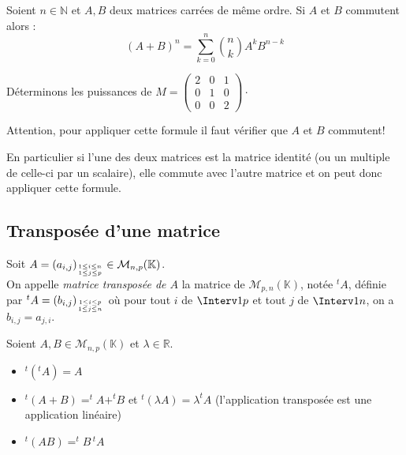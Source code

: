 \documentclass[a4paper,10pt]{report}
\begin{document}
\begin{thm}
Soient $n\in \mathbb{N}$ et $A,B$ deux matrices carrées de même ordre. Si $A$ et $B$ commutent alors :
\[ (A+B)^n = \sum_{k=0}^n \binom{n}{k} A^k B^{n-k} \]
\end{thm}

\begin{ex} Déterminons les puissances de $M = \begin{pmatrix}
2 & 0 & 1 \\
0 & 1 & 0 \\
0 & 0 & 2
\end{pmatrix}\cdot$

\vspace{10cm}
\end{ex}

\begin{rems}
\item Attention, pour appliquer cette formule il faut vérifier que $A$ et $B$ commutent!
\item En particulier si l'une des deux matrices est la matrice identité (ou un multiple de celle-ci par un scalaire), elle commute avec l'autre matrice et on peut donc appliquer cette formule.
\end{rems}

\subsection{Transposée d'une matrice}
\begin{defin}
 
Soit $A=(a_{i,j})_{{1 \leq i \leq n}\atop{1 \leq j \leq p}} \in \mathcal{M}_{n,p}(\mathbb{K})$.\\


\noindent On appelle \textit{matrice transposée de $A$} la matrice de $\mathcal{M}_{p,n}(\mathbb{K})$, notée $^tA$, définie par \linebreak $^tA=(b_{i,j})_{{1 \leq i \leq p}\atop{1 \leq j \leq n}}$  où pour tout  $i$ de $\Interv 1p$ et tout $j$ de $\Interv 1n$, on a $b_{i,j}= a_{j,i}.$
\end{defin}


\begin{prop}
Soient $A,B \in \mathcal{M}_{n,p}(\mathbb{K})$ et $\lambda \in \mathbb{R}$.
\begin{itemize}
\item 
$^t(^tA)= A$ 
\item 
$^t(A+B)=^tA + ^tB $ et $^t( \lambda A) = \lambda ^tA$ (l'application transposée est une application linéaire)
\item $^t(AB) =^tB \, ^tA$
\end{itemize}
\end{prop}
\end{document}
